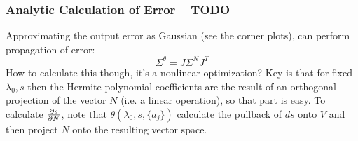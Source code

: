 \documentclass{beamer}
\begin{document}
\begin{frame}
	\frametitle{Analytic Calculation of Error -- TODO}
	Approximating the output error as Gaussian (see the corner plots), can perform propagation of error:
	\begin{equation}
	\Sigma^\theta = J \Sigma^N J^T
	\end{equation}
	How to calculate this though, it's a nonlinear optimization? Key is that for fixed \(\lambda_0, s\) then the Hermite polynomial coefficients are the result of an orthogonal projection of the vector \(N\) (i.e. a linear operation), so that part is easy. To calculate \(\pdv{s}{N}\), note that \(\theta(\lambda_0,s, \{a_j\})\) calculate the pullback of \(ds\) onto \(V\) and then project \(N\) onto the resulting vector space.
\end{frame}
\end{document}
